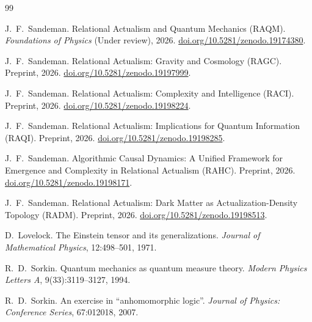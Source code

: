 \documentclass[11pt,a4paper]{article}
\theoremstyle{plain}
\theoremstyle{definition}
\theoremstyle{remark}
\begin{document}

\begin{thebibliography}{99}

J.~F.~Sandeman.
\newblock Relational Actualism and Quantum Mechanics ({RAQM}).
\newblock \textit{Foundations of Physics} (Under review), 2026.
\newblock \href{https://doi.org/10.5281/zenodo.19174380}{doi.org/10.5281/zenodo.19174380}.

J.~F.~Sandeman.
\newblock Relational Actualism: Gravity and Cosmology ({RAGC}).
\newblock Preprint, 2026.
\newblock \href{https://doi.org/10.5281/zenodo.19197999}{doi.org/10.5281/zenodo.19197999}.

J.~F.~Sandeman.
\newblock Relational Actualism: Complexity and Intelligence ({RACI}).
\newblock Preprint, 2026.
\newblock \href{https://doi.org/10.5281/zenodo.19198224}{doi.org/10.5281/zenodo.19198224}.

J.~F.~Sandeman.
\newblock Relational Actualism: Implications for Quantum Information ({RAQI}).
\newblock Preprint, 2026.
\newblock \href{https://doi.org/10.5281/zenodo.19198285}{doi.org/10.5281/zenodo.19198285}.

J.~F.~Sandeman.
\newblock Algorithmic Causal Dynamics: A Unified Framework for Emergence
  and Complexity in Relational Actualism ({RAHC}).
\newblock Preprint, 2026.
\newblock \href{https://doi.org/10.5281/zenodo.19198171}{doi.org/10.5281/zenodo.19198171}.

J.~F.~Sandeman.
\newblock Relational Actualism: Dark Matter as Actualization-Density
  Topology ({RADM}).
\newblock Preprint, 2026.
\newblock \href{https://doi.org/10.5281/zenodo.19198513}{doi.org/10.5281/zenodo.19198513}.

D.~Lovelock.
\newblock The Einstein tensor and its generalizations.
\newblock \textit{Journal of Mathematical Physics}, 12:498--501, 1971.

R.~D.~Sorkin.
\newblock Quantum mechanics as quantum measure theory.
\newblock \textit{Modern Physics Letters A}, 9(33):3119--3127, 1994.

R.~D.~Sorkin.
\newblock An exercise in ``anhomomorphic logic''.
\newblock \textit{Journal of Physics: Conference Series}, 67:012018, 2007.


\end{thebibliography}
\end{document}
